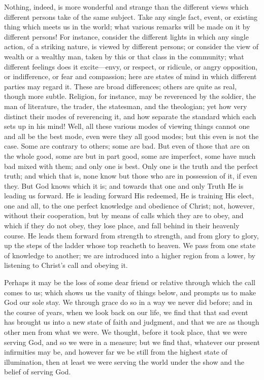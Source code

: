 Nothing, indeed, is more wonderful and strange than the different
views which different persons take of the same subject. Take any
single fact, event, or existing thing which meets us in the world;
what various remarks will be made on it by different persons! For
instance, consider the different lights in which any single action, of
a striking nature, is viewed by different persons; or consider the
view of wealth or a wealthy man, taken by this or that class in the
community; what different feelings does it excite—envy, or respect,
or ridicule, or angry opposition, or indifference, or fear and
compassion; here are states of mind in which different parties may
regard it. These are broad differences; others are quite as real,
though more subtle. Religion, for instance, may be reverenced by the
soldier, the man of literature, the trader, the statesman, and the
theologian; yet how very distinct their modes of reverencing it, and
how separate the standard which each sets up in his mind! Well, all
these various modes of viewing things cannot one and all be the best
mode, even were they all good modes; but this even is not the case.
Some are contrary to others; some are bad. But even of those that are
on the whole good, some are but in part good, some are imperfect, some
have much bad mixed with them; and only one is best. Only one is the
truth and the perfect truth; and which that is, none know but those
who are in possession of it, if even they. But God knows which it is;
and towards that one and only Truth He is leading us forward. He is
leading forward His redeemed, He is training His elect, one and all,
to the one perfect knowledge and obedience of Christ; not, however,
without their cooperation, but by means of calls which they are to
obey, and which if they do not obey, they lose place, and fall behind
in their heavenly course. He leads them forward from strength to
strength, and from glory to glory, up the steps of the ladder whose
top reacheth to heaven. We pass from one state of knowledge to
another; we are introduced into a higher region from a lower, by
listening to Christ's call and obeying it.

Perhaps it may be the loss of some dear friend or relative through
which the call comes to us; which shows us the vanity of things below,
and prompts us to make God our sole stay. We through grace do so in a
way we never did before; and in the course of years, when we look back
on our life, we find that that sad event has brought us into a new
state of faith and judgment, and that we are as though other men from
what we were. We thought, before it took place, that we were serving
God, and so we were in a measure; but we find that, whatever our
present infirmities may be, and however far we be still from the
highest state of illumination, then at least we were serving the world
under the show and the belief of serving God.

